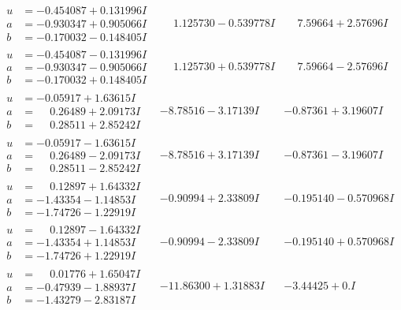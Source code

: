 \documentclass[1p]{elsarticle_modified}
\theoremstyle{definition}
\begin{document}
$$\begin{array}{c|c|c}
\begin{aligned}
u &= -0.454087 + 0.131996 I \\
a &= -0.930347 + 0.905066 I \\
b &= -0.170032 - 0.148405 I\end{aligned}
 & \phantom{-}1.125730 - 0.539778 I & \phantom{-}7.59664 + 2.57696 I \\ \hline\begin{aligned}
u &= -0.454087 - 0.131996 I \\
a &= -0.930347 - 0.905066 I \\
b &= -0.170032 + 0.148405 I\end{aligned}
 & \phantom{-}1.125730 + 0.539778 I & \phantom{-}7.59664 - 2.57696 I \\ \hline\begin{aligned}
u &= -0.05917 + 1.63615 I \\
a &= \phantom{-}0.26489 + 2.09173 I \\
b &= \phantom{-}0.28511 + 2.85242 I\end{aligned}
 & -8.78516 - 3.17139 I & -0.87361 + 3.19607 I \\ \hline\begin{aligned}
u &= -0.05917 - 1.63615 I \\
a &= \phantom{-}0.26489 - 2.09173 I \\
b &= \phantom{-}0.28511 - 2.85242 I\end{aligned}
 & -8.78516 + 3.17139 I & -0.87361 - 3.19607 I \\ \hline\begin{aligned}
u &= \phantom{-}0.12897 + 1.64332 I \\
a &= -1.43354 - 1.14853 I \\
b &= -1.74726 - 1.22919 I\end{aligned}
 & -0.90994 + 2.33809 I & -0.195140 - 0.570968 I \\ \hline\begin{aligned}
u &= \phantom{-}0.12897 - 1.64332 I \\
a &= -1.43354 + 1.14853 I \\
b &= -1.74726 + 1.22919 I\end{aligned}
 & -0.90994 - 2.33809 I & -0.195140 + 0.570968 I \\ \hline\begin{aligned}
u &= \phantom{-}0.01776 + 1.65047 I \\
a &= -0.47939 - 1.88937 I \\
b &= -1.43279 - 2.83187 I\end{aligned}
 & -11.86300 + 1.31883 I & -3.44425 + 0. I\phantom{ +0.000000I} \\ \hline\begin{aligned}

\end{aligned}
\end{array}$$
\end{document}
